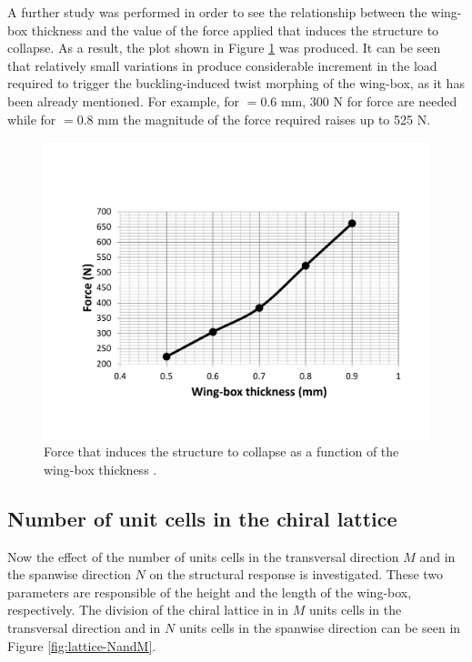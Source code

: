     A further study was performed in order to see the relationship between the wing-box thickness and the value of the force applied that induces the structure to collapse. As a result, the plot shown in Figure \ref{fig:force_cbox_t} was produced. It can be seen that relatively small variations in \boxt produce considerable increment in the load required to trigger the buckling-induced twist morphing of the wing-box, as it has been already mentioned. For example, for \boxt$ = 0.6$ mm, 300 N for force are needed while for \boxt$ = 0.8$ mm the magnitude of the force required raises up to 525 N.

    \begin{figure}[!htpb] %
      \centering
      \includegraphics[width=0.8 \textwidth]{figures/../figures/result-sim/cbox/force_cbox_t}
      \caption[Force that induces the structure to collapse as a function of the wing-box thickness]{Force that induces the structure to collapse as a function of the wing-box thickness \boxt.}\label{fig:force_cbox_t}
    \end{figure}

  \clearpage
  \subsection{Number of unit cells in the chiral lattice} \label{subsec:MandN_para}

    Now the effect of the number of units cells in the transversal direction $M$ and in the spanwise direction $N$ on the structural response is investigated. These two parameters are responsible of the height and the length of the wing-box, respectively. The division of the chiral lattice in in $M$ units cells in the transversal direction and in $N$ units cells in the spanwise direction can be seen in Figure \ref{fig:lattice-NandM}.

